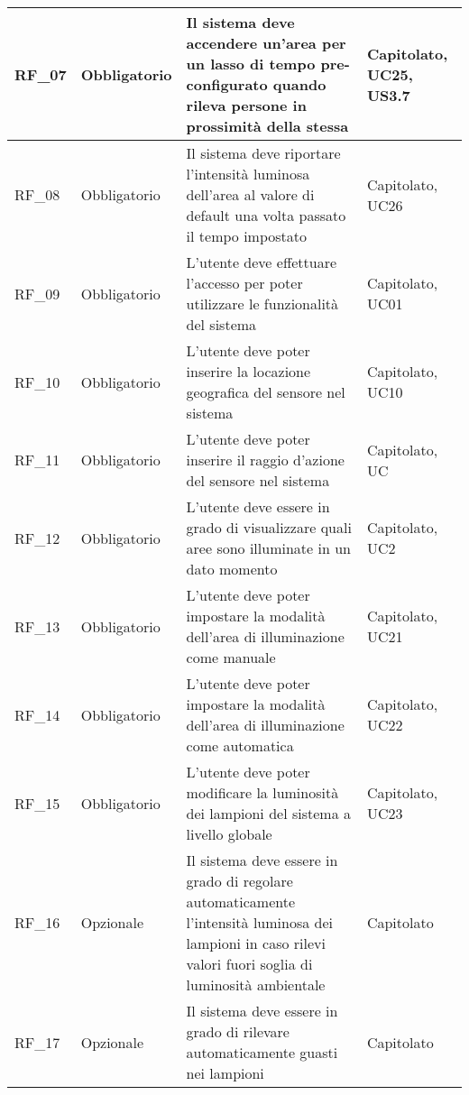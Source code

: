 \begin{center}
\begin{xltabular}{\linewidth}{|l|l|X|l|}
        \hline
        RF\_07 & Obbligatorio & Il sistema deve accendere un'area per un lasso di tempo pre-configurato quando rileva persone in prossimità della stessa & Capitolato, UC25, US3.7 \\

        \hline
        RF\_08 & Obbligatorio & Il sistema deve riportare l'intensità luminosa dell'area al valore di default una volta passato il tempo impostato & Capitolato, UC26 \\

        \hline
        RF\_09 & Obbligatorio & L'utente deve effettuare l'accesso per poter utilizzare le funzionalità del sistema & Capitolato, UC01\\

        \hline
        RF\_10 & Obbligatorio & L'utente deve poter inserire la locazione geografica del sensore nel sistema & Capitolato, UC10\\

        \hline
        RF\_11 & Obbligatorio & L'utente deve poter inserire il raggio d'azione del sensore nel sistema & Capitolato, UC\\ %

        \hline
        RF\_12 & Obbligatorio & L'utente deve essere in grado di visualizzare quali aree sono illuminate in un dato momento & Capitolato, UC2\\

        \hline
        RF\_13 & Obbligatorio & L'utente deve poter impostare la modalità dell'area di illuminazione come manuale & Capitolato, UC21\\

        \hline
        RF\_14 & Obbligatorio & L'utente deve poter impostare la modalità dell'area di illuminazione come automatica & Capitolato, UC22\\

        \hline
        RF\_15 & Obbligatorio & L'utente deve poter modificare la luminosità dei lampioni del sistema a livello globale & Capitolato, UC23\\

        \hline
        RF\_16 & Opzionale & Il sistema deve essere in grado di regolare automaticamente l'intensità luminosa dei lampioni in caso rilevi valori fuori soglia di luminosità ambientale & Capitolato\\

        \hline
        RF\_17 & Opzionale & Il sistema deve essere in grado di rilevare automaticamente guasti nei lampioni & Capitolato \\


\end{xltabular}
\end{center}
